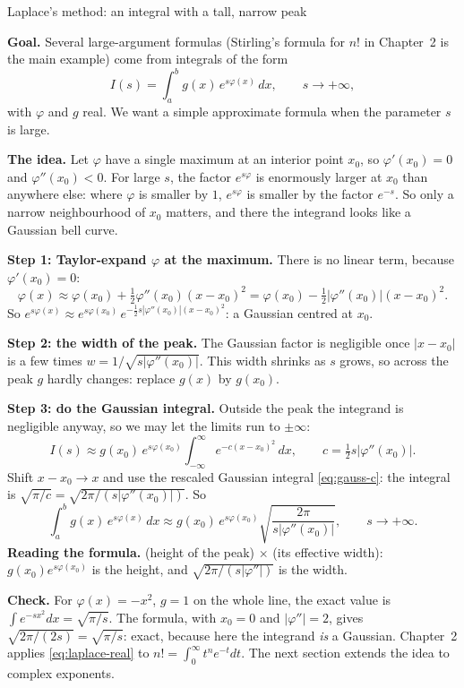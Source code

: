 \documentclass[11pt]{beamer}
\begin{document}
\begin{frame}[allowframebreaks=1.00]{Laplace's method: an integral with a tall, narrow peak}
\footnotesize

\textbf{Goal.} Several large-argument formulas (Stirling's formula for \(n!\) in Chapter~2 is the
main example) come from integrals of the form
\[
  I(s)=\int_a^b g(x)\,e^{s\varphi(x)}\,dx,\qquad s\to+\infty,
\]
with \(\varphi\) and \(g\) real. We want a simple approximate formula when the parameter \(s\) is large.

\textbf{The idea.} Let \(\varphi\) have a single maximum at an interior point \(x_0\), so
\(\varphi'(x_0)=0\) and \(\varphi''(x_0)<0\). For large \(s\), the factor \(e^{s\varphi}\) is enormously larger at
\(x_0\) than anywhere else: where \(\varphi\) is smaller by \(1\), \(e^{s\varphi}\) is smaller by the factor
\(e^{-s}\). So only a narrow neighbourhood of \(x_0\) matters, and there the integrand looks like a
Gaussian bell curve.

\textbf{Step 1: Taylor-expand \(\varphi\) at the maximum.} There is no linear term, because
\(\varphi'(x_0)=0\):
\[
 \varphi(x)\approx\varphi(x_0)+\tfrac12\varphi''(x_0)(x-x_0)^2
 =\varphi(x_0)-\tfrac12\bigl|\varphi''(x_0)\bigr|(x-x_0)^2 .
\]
So \(e^{s\varphi(x)}\approx e^{s\varphi(x_0)}\,e^{-\frac12 s|\varphi''(x_0)|(x-x_0)^2}\): a Gaussian centred at \(x_0\).

\textbf{Step 2: the width of the peak.} The Gaussian factor is negligible once \(|x-x_0|\) is a few
times \(w=1/\sqrt{s|\varphi''(x_0)|}\). This width shrinks as \(s\) grows, so across the peak \(g\) hardly
changes: replace \(g(x)\) by \(g(x_0)\).
\par\framebreak\par
\textbf{Step 3: do the Gaussian integral.} Outside the peak the integrand is negligible anyway, so we
may let the limits run to \(\pm\infty\):
\[
 I(s)\approx g(x_0)\,e^{s\varphi(x_0)}\int_{-\infty}^{\infty}e^{-c(x-x_0)^2}\,dx,
 \qquad c=\tfrac12 s\bigl|\varphi''(x_0)\bigr| .
\]
Shift \(x-x_0\to x\) and use the rescaled Gaussian integral \eqref{eq:gauss-c}: the integral is
\(\sqrt{\pi/c}=\sqrt{2\pi/(s|\varphi''(x_0)|)}\). So
\begin{equation}
  \int_a^b g(x)\,e^{s\varphi(x)}\,dx
  \approx
  g(x_0)\,e^{s\varphi(x_0)}
  \sqrt{\frac{2\pi}{s\bigl|\varphi''(x_0)\bigr|}},
  \qquad s\to+\infty.
  \label{eq:laplace-real}
\end{equation}
\textbf{Reading the formula.} (height of the peak) \(\times\) (its effective width):
\(g(x_0)e^{s\varphi(x_0)}\) is the height, and \(\sqrt{2\pi/(s|\varphi''|)}\) is the width.

\textbf{Check.} For \(\varphi(x)=-x^2\), \(g=1\) on the whole line, the exact value is
\(\int e^{-sx^2}dx=\sqrt{\pi/s}\). The formula, with \(x_0=0\) and \(|\varphi''|=2\), gives
\(\sqrt{2\pi/(2s)}=\sqrt{\pi/s}\): exact, because here the integrand \emph{is} a Gaussian.
Chapter~2 applies \eqref{eq:laplace-real} to \(n!=\int_0^\infty t^ne^{-t}dt\). The next section extends the
idea to complex exponents.
\end{frame}
\end{document}
